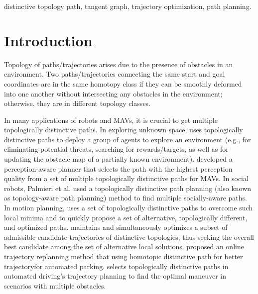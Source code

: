\documentclass[letterpaper, 10 pt, journal, twoside]{IEEEtran}
\begin{document}
\begin{IEEEkeywords}
distinctive topology path, tangent graph, trajectory optimization, path planning.
\end{IEEEkeywords}

\section{Introduction}


Topology of paths/trajectories arises due to the presence of obstacles in an environment. Two paths/trajectories connecting the same start and goal coordinates are in the same homotopy class if they can be smoothly deformed into one another without intersecting any obstacles in the environment; otherwise, they are in different topology classes.

In many applications of robots and MAVs, it is crucial to get multiple topologically distinctive paths. In exploring unknown space, \cite{kim2013topological} uses topologically distinctive paths to deploy a group of agents to explore an environment (e.g., for eliminating potential threats, searching for rewards/targets, as well as for updating the obstacle map of a partially known environment). \cite{kim2021topology} developed a perception-aware planner that selects the path with the highest perception quality from a set of multiple topologically distinctive paths for MAVs. In social robots, Palmieri et al. \cite{palmieri2015fast} used a topologically distinctive path planning (also known as topology-aware path planning) method to find multiple socially-aware paths. In motion planning, \cite{kuderer2014online} uses a set of topologically distinctive paths to overcome such local minima and to quickly propose a set of alternative, topologically different, and optimized paths. \cite{rosmann2017integrated} maintains and simultaneously optimizes a subset of admissible candidate trajectories of distinctive topologies, thus seeking the overall best candidate among the set of alternative local solutions. \cite{li2022online} proposed an online trajectory replanning method that using homotopic distinctive path for better trajectoryfor automated parking. \cite{kolur2019online} selects topologically distinctive paths in automated driving's trajectory planning to find the optimal maneuver in scenarios with multiple obstacles. 
\end{document}
